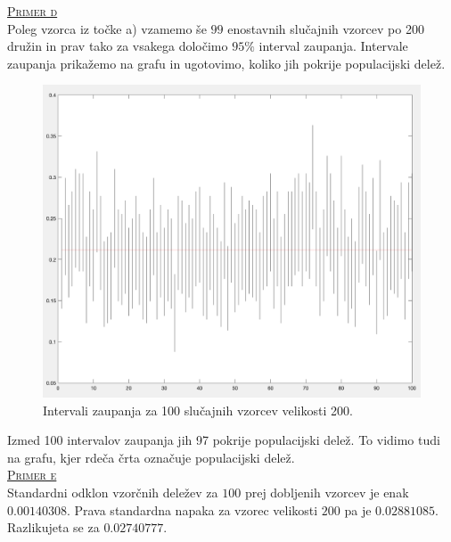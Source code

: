 \documentclass[a4paper,12pt]{article}
\begin{document}
\noindent
\textsc{\underline{Primer d}}
\\
Poleg vzorca iz točke a) vzamemo še $99$ enostavnih slučajnih vzorcev po 200 družin in prav tako za vsakega določimo $95 \%$ interval zaupanja. Intervale zaupanja prikažemo na grafu in ugotovimo, koliko jih pokrije populacijski delež.
\begin{figure}[ht!]
    \centering
    \includegraphics[width=120mm]{CI_200.png}
    \caption{Intervali zaupanja za 100 slučajnih vzorcev velikosti 200.}
\end{figure}

\noindent
Izmed 100 intervalov zaupanja jih 97 pokrije populacijski delež. To vidimo tudi na grafu, kjer rdeča črta označuje populacijski delež.
\\

\noindent
\textsc{\underline{Primer e}}
\\
Standardni odklon vzorčnih deležev za $100$ prej dobljenih vzorcev je enak $0.00140308$. Prava standardna napaka za vzorec velikosti $200$ pa je $0.02881085$.
Razlikujeta se za $0.02740777$.
\\

\end{document}
